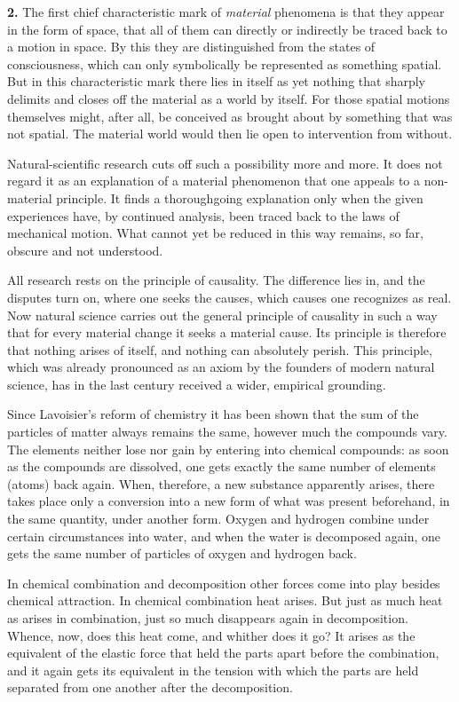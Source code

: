 \documentclass[12pt,a4paper]{book}
\newcommand{\opage}[1]{\marginnote{\footnotesize\textit{[#1]}}}
\begin{document}
\textbf{2.} The first chief characteristic mark of \emph{material}
phenomena is that they appear in the form of space, that all of them
can directly or indirectly be traced back to a motion in space. By this
they are distinguished from the states of consciousness, which can only
symbolically be represented as something spatial. But in this
characteristic mark there lies in itself as yet nothing that sharply
delimits and closes off the material as a world by itself. For those
spatial motions themselves might, after all, be conceived as brought
about by something that was not spatial. The material world would then
lie open to intervention from without.

Natural-scientific research cuts off such a possibility more and more.
It does not regard it as an explanation of a material phenomenon that
one appeals to a non-material principle. It finds a thoroughgoing
explanation only when the given experiences have, by continued
analysis, been traced back to the laws of mechanical motion. What cannot
yet be reduced in this way remains, so far, obscure and not understood.


\opage{38}All research rests on the principle of causality. The
difference lies in, and the disputes turn on, where one seeks the
causes, which causes one recognizes as real. Now natural science carries
out the general principle of causality in such a way that for every
material change it seeks a material cause. Its principle is therefore
that nothing arises of itself, and nothing can absolutely perish. This
principle, which was already pronounced as an axiom by the founders of
modern natural science, has in the last century received a wider,
empirical grounding.

Since Lavoisier's reform of chemistry it has been shown that the sum of
the particles of matter always remains the same, however much the
compounds vary. The elements neither lose nor gain by entering into
chemical compounds: as soon as the compounds are dissolved, one gets
exactly the same number of elements (atoms) back again. When, therefore,
a new substance apparently arises, there takes place only a conversion
into a new form of what was present beforehand, in the same quantity,
under another form. Oxygen and hydrogen combine under certain
circumstances into water, and when the water is decomposed again, one
gets the same number of particles of oxygen and hydrogen back.

In chemical combination and decomposition other forces come into play
besides chemical attraction. In chemical combination heat arises. But
just as much heat as arises in combination, just so much disappears
again in decomposition. Whence, now, does this heat come, and whither
does it go? It arises as the equivalent of the elastic force that held
the parts apart before the combination, and it again gets its
equivalent in the tension with which the parts are held separated from
one another after the decomposition.
\end{document}
